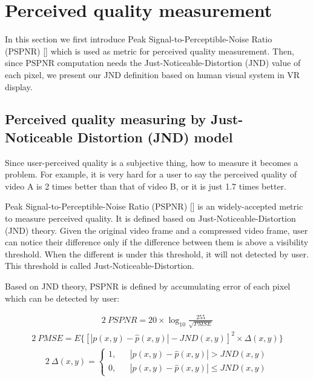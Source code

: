 \section{Perceived quality measurement}

In this section we first introduce Peak Signal-to-Perceptible-Noise Ratio (PSPNR) [] which is used as metric for perceived quality measurement. Then, since PSPNR computation needs the Just-Noticeable-Distortion (JND) value of each pixel, we present our JND definition based on human visual system in VR display.

\subsection{Perceived quality measuring by Just-Noticeable Distortion (JND) model}

Since user-perceived quality is a subjective thing, how to measure it becomes a problem. For example, it is very hard for a user to say the perceived quality of video A is 2 times better than that of video B, or it is just 1.7 times better.

Peak Signal-to-Perceptible-Noise Ratio (PSPNR) [] is an widely-accepted metric to measure perceived quality. It is defined based on Just-Noticeable-Distortion (JND) theory. Given the original video frame and a compressed video frame, user can notice their difference only if the difference between them is above a visibility threshold. When the different is under this threshold, it will not detected by user. This threshold is called Just-Noticeable-Distortion.

Based on JND theory, PSPNR is defined by accumulating error of each pixel which can be detected by user:

\begin{alignat}{2}\
\label{f1} PSPNR = 20 \times \log_{10}\frac{255}{\sqrt{PMSE}}
\end{alignat}
\begin{alignat}{2}\
PMSE=E\{ \left[ |p(x, y) - \hat{p}(x, y)| - JND(x, y)\right]^2 \times \Delta (x, y)\}
\end{alignat}
\begin{alignat}{2}\
\Delta (x, y) =\left\{
\begin{aligned}
1, & &|p(x, y) - \hat{p}(x, y)| > JND(x, y) \\
0, & &|p(x, y) - \hat{p}(x, y)| \le JND(x, y)
\end{aligned}
\right.
\end{alignat}

